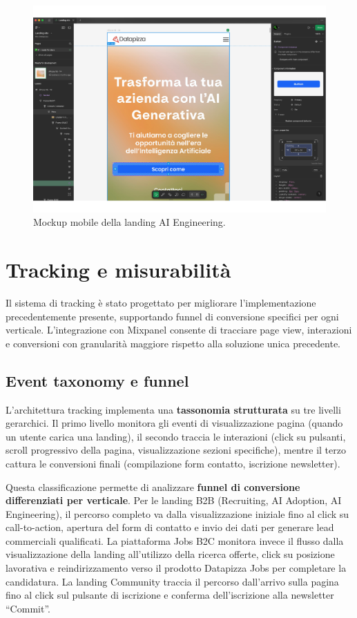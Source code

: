 \clearpage
\begin{figure}[h!]
    \centering
    \includegraphics[width=1.06\textwidth]{chapters/figures/mockup2.pdf}
    \caption{Mockup mobile della landing AI Engineering.}
    \label{fig:ai-eng-mobile}
\end{figure}
\clearpage

\section{Tracking e misurabilità}
Il sistema di tracking è stato progettato per migliorare l'implementazione 
precedentemente presente, supportando funnel di conversione specifici per ogni 
verticale. L'integrazione con Mixpanel consente di tracciare page view, 
interazioni e conversioni con granularità maggiore rispetto alla soluzione unica 
precedente.

\subsection{Event taxonomy e funnel}
L'architettura tracking implementa una \textbf{tassonomia strutturata} 
su tre livelli gerarchici. Il primo livello monitora gli eventi di 
visualizzazione pagina (quando un utente carica una landing), il secondo 
traccia le interazioni (click su pulsanti, scroll progressivo della pagina, 
visualizzazione sezioni specifiche), mentre il terzo cattura le conversioni 
finali (compilazione form contatto, iscrizione newsletter).

Questa classificazione permette di analizzare \textbf{funnel di conversione 
differenziati per verticale}. Per le landing B2B (Recruiting, AI Adoption, 
AI Engineering), il percorso completo va dalla visualizzazione iniziale 
fino al click su call-to-action, apertura del form di contatto e invio 
dei dati per generare lead commerciali qualificati. La piattaforma Jobs 
B2C monitora invece il flusso dalla visualizzazione della landing all'utilizzo 
della ricerca offerte, click su posizione lavorativa e reindirizzamento 
verso il prodotto Datapizza Jobs per completare la candidatura. La landing 
Community traccia il percorso dall'arrivo sulla pagina fino al click sul 
pulsante di iscrizione e conferma dell'iscrizione alla newsletter ``Commit''.

